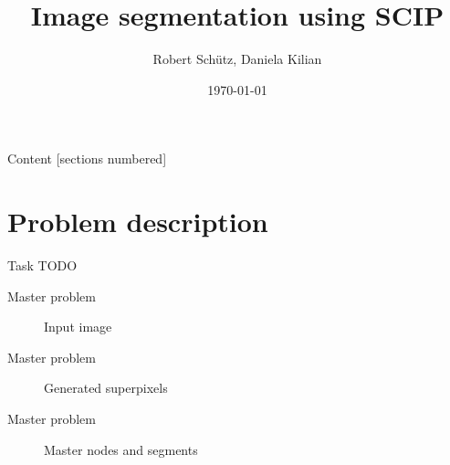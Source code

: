 \documentclass[fleqn]{beamer}
\title{Image segmentation using SCIP}
\subtitle{}
\date{\today}
\author{Robert Schütz, Daniela Kilian}
\institute{Advanced project SS 2017}
\begin{document}
	\maketitle
	
	\begin{frame}{Content}
		[sections numbered]
		\tableofcontents
	\end{frame}

	\section{Problem description}
	\begin{frame}{Task}
		TODO
	\end{frame}
	
	\begin{frame}{Master problem}
		\begin{figure}
            \begin{center}
                \def\svgwidth{60mm}
                
                \caption{Input image}
            \end{center}
		\end{figure}
	\end{frame}

    \begin{frame}{Master problem}
        \begin{figure}
            \begin{center}
               \def\svgwidth{60mm}
               
               \caption{Generated superpixels}
           \end{center}
        \end{figure}
    \end{frame}

    \begin{frame}{Master problem}
        \begin{figure}
            \begin{center}
                \def\svgwidth{60mm}
                
                \caption{Master nodes and segments}
            \end{center}
        \end{figure}
    \end{frame}	
\end{document}
